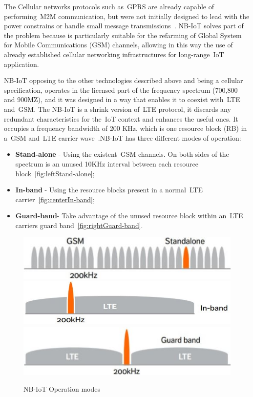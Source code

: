 The Cellular networks protocols such as~\gls{GPRS} are already capable of performing~\gls{M2M} communication, but were not  initially designed to lead with the power constrains or handle small message transmissions~\cite{Anteur2016}. NB-IoT solves part of the problem because is particularly suitable for the refarming of Global System for Mobile Communications (\gls{GSM}) channels, allowing in this way the use of  already established cellular networking infrastructures for long-range~\gls{IoT} application.

NB-IoT opposing to the other technologies described above and being a cellular specification, operates in the licensed part of the frequency spectrum (700,800 and 900MZ), and it was designed in a way that enables it to coexist with~\gls{LTE} and~\gls{GSM}. The NB-IoT is a shrink version of~\gls{LTE} protocol, it discards any redundant characteristics for the~\gls{IoT} context and enhances the useful ones. It occupies a frequency bandwidth of 200 KHz, which is one resource block (RB) in a~\gls{GSM} and~\gls{LTE} carrier wave~\cite{Mekki2019}.\newline NB-IoT has three different modes of operation:
\begin{itemize}
	\item \textbf{Stand-alone} - Using the existent~\gls{GSM} channels. On both sides of the spectrum is an unused 10KHz interval between each resource block~\ref{fig:leftStand-alone};
	\item\textbf{In-band} - Using the resource blocks present in a normal~\gls{LTE} carrier~\ref{fig:centerIn-band};
	\item \textbf{Guard-band}- Take advantage of the unused resource block within an~\gls{LTE} carriers guard band~\ref{fig:rightGuard-band}.

\end{itemize} 

\begin{figure}[htbp]
  \centering
    {\includegraphics[width=0.33\linewidth]{Chapters/Figures/NB-Stand-Alone.JPG}}%
    {\includegraphics[width=0.33\linewidth]{Chapters/Figures/NB-In-Band.JPG}}%
    {\includegraphics[width=0.33\linewidth]{Chapters/Figures/NB-Guard-Band.JPG}}%
  \caption{NB-IoT Operation modes~\cite{Ericson}}
  \label{fig:NBfig3subfig}
\end{figure}




